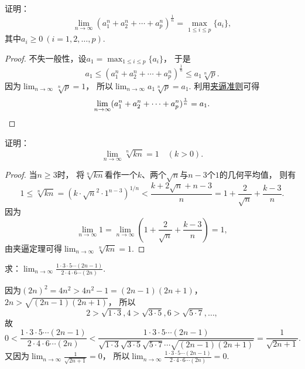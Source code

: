 \begin{example}
证明：\[
	\lim_{n\to\infty} (a_1^n + a_2^n + \dotsb + a_p^n)^{\frac1n}
	= \max_{1\leq i\leq p} \{a_i\},
\]
其中\(a_i\geq0\ (i=1,2,\dotsc,p)\).
\begin{proof}
不失一般性，设\(a_1 = \max_{1\leq i\leq p} \{a_i\}\)，
于是\[
	a_1 \leq (a_1^n + a_2^n + \dotsb + a_p^n)^{\frac1n} \leq a_1 \sqrt[n]{p}.
\]
因为\(\lim_{n\to\infty} \sqrt[n]{p} = 1\)，
所以\(\lim_{n\to\infty} a_1 \sqrt[n]{p} = a_1\).
利用\hyperref[theorem:极限.夹逼准则]{夹逼准则}可得\[
	\lim_{n\to\infty} (a_1^n + a_2^n + \dotsb + a_p^n)^{\frac1n} = a_1.
	\qedhere
\]
\end{proof}
\end{example}

\begin{example}
证明：\begin{equation}
	\lim_{n\to\infty} \sqrt[n]{k n} = 1
	\quad(k>0).
\end{equation}
\begin{proof}
当\(n \geq 3\)时，
将\(\sqrt[n]{k n}\)看作一个\(k\)、两个\(\sqrt{n}\)与\(n-3\)个\(1\)的几何平均值，
则有\[
	1 \leq \sqrt[n]{k n} = (k \cdot \sqrt{n}^2 \cdot 1^{n-3})^{1/n}
	< \frac{k + 2\sqrt{n} + n-3}{n}
	= 1 + \frac{2}{\sqrt{n}} + \frac{k-3}{n}.
\]
因为\[
	\lim_{n\to\infty} 1
	= \lim_{n\to\infty} \left(1 + \frac{2}{\sqrt{n}} + \frac{k-3}{n}\right) = 1,
\]
由夹逼定理可得\(\lim_{n\to\infty} \sqrt[n]{k n} = 1\).
\end{proof}
\end{example}

\begin{example}\label{example:极限.两个双阶乘的商的极限}
求：\(\lim_{n\to\infty} \frac{1 \cdot 3 \cdot 5 \dotsm (2n-1)}{2 \cdot 4 \cdot 6 \dotsm (2n)}\).
\begin{solution}
因为\((2n)^2 = 4n^2 > 4n^2-1 = (2n-1)(2n+1)\)，\(2n > \sqrt{(2n-1)(2n+1)}\)，
所以\[
	2 > \sqrt{1 \cdot 3},
	4 > \sqrt{3 \cdot 5},
	6 > \sqrt{5 \cdot 7},
	\dotsc,
\]
故\[
	0 < \frac{1 \cdot 3 \cdot 5 \dotsm (2n-1)}{2 \cdot 4 \cdot 6 \dotsm (2n)}
	< \frac{1 \cdot 3 \cdot 5 \dotsm (2n-1)}{\sqrt{1 \cdot 3} \sqrt{3 \cdot 5} \sqrt{5 \cdot 7} \dotsm \sqrt{(2n-1)(2n+1)}}
	= \frac{1}{\sqrt{2n+1}}.
\]
又因为\(\lim_{n\to\infty}\frac{1}{\sqrt{2n+1}} = 0\)，
所以\(\lim_{n\to\infty}\frac{1 \cdot 3 \cdot 5 \dotsm (2n-1)}{2 \cdot 4 \cdot 6 \dotsm (2n)} = 0\).
\end{solution}
\end{example}


